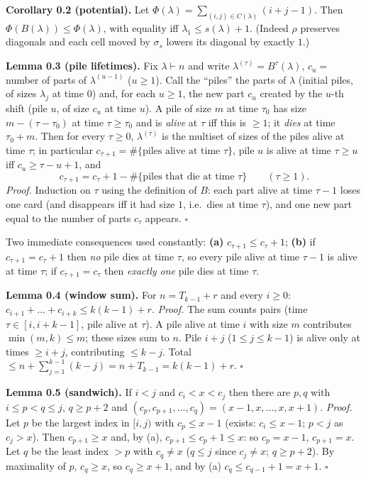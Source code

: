 \textbf{Corollary 0.2 (potential).} Let
\(\Phi(\lambda)=\sum_{(i,j)\in C(\lambda)}(i+j-1)\). Then
\(\Phi(B(\lambda))\le\Phi(\lambda)\), with equality iff
\(\lambda_1\le s(\lambda)+1\). (Indeed \(\rho\) preserves diagonals and
each cell moved by \(\sigma_s\) lowers its diagonal by exactly \(1\).)

\textbf{Lemma 0.3 (pile lifetimes).} Fix \(\lambda\vdash n\) and write
\(\lambda^{(\tau)}=B^{\tau}(\lambda)\), \(c_u=\) number of parts of
\(\lambda^{(u-1)}\) (\(u\ge1\)). Call the ``piles'' the parts of
\(\lambda\) (initial piles, of sizes \(\lambda_j\) at time \(0\)) and,
for each \(u\ge1\), the new part \(c_u\) created by the \(u\)-th shift
(pile \(u\), of size \(c_u\) at time \(u\)). A pile of size \(m\) at
time \(\tau_0\) has size \(m-(\tau-\tau_0)\) at time \(\tau\ge\tau_0\)
and is \emph{alive} at \(\tau\) iff this is \(\ge1\); it \emph{dies} at
time \(\tau_0+m\). Then for every \(\tau\ge0\), \(\lambda^{(\tau)}\) is
the multiset of sizes of the piles alive at time \(\tau\); in particular
\(c_{\tau+1}=\#\{\text{piles alive at time }\tau\}\), pile \(u\) is
alive at time \(\tau\ge u\) iff \(c_u\ge\tau-u+1\), and
\[c_{\tau+1}=c_\tau+1-\#\{\text{piles that die at time }\tau\}\qquad(\tau\ge1).\tag{0.3}\]
\emph{Proof.} Induction on \(\tau\) using the definition of \(B\): each
part alive at time \(\tau-1\) loses one card (and disappears iff it had
size \(1\), i.e.~dies at time \(\tau\)), and one new part equal to the
number of parts \(c_\tau\) appears. \(\square\)

Two immediate consequences used constantly: \textbf{(a)}
\(c_{\tau+1}\le c_\tau+1\); \textbf{(b)} if \(c_{\tau+1}=c_\tau+1\) then
\emph{no} pile dies at time \(\tau\), so every pile alive at time
\(\tau-1\) is alive at time \(\tau\); if \(c_{\tau+1}=c_\tau\) then
\emph{exactly one} pile dies at time \(\tau\).

\textbf{Lemma 0.4 (window sum).} For \(n=T_{k-1}+r\) and every
\(i\ge0\): \(c_{i+1}+\dots+c_{i+k}\le k(k-1)+r\). \emph{Proof.} The sum
counts pairs (time \(\tau\in[i,i+k-1]\), pile alive at \(\tau\)). A pile
alive at time \(i\) with size \(m\) contributes \(\min(m,k)\le m\);
these sizes sum to \(n\). Pile \(i+j\) (\(1\le j\le k-1\)) is alive only
at times \(\ge i+j\), contributing \(\le k-j\). Total
\(\le n+\sum_{j=1}^{k-1}(k-j)=n+T_{k-1}=k(k-1)+r\). \(\square\)

\textbf{Lemma 0.5 (sandwich).} If \(i<j\) and \(c_i<x<c_j\) then there
are \(p,q\) with \(i\le p<q\le j\), \(q\ge p+2\) and
\((c_p,c_{p+1},\dots,c_q)=(x-1,x,\dots,x,x+1)\). \emph{Proof.} Let \(p\)
be the largest index in \([i,j)\) with \(c_p\le x-1\) (exists:
\(c_i\le x-1\); \(p<j\) as \(c_j>x\)). Then \(c_{p+1}\ge x\) and, by
(a), \(c_{p+1}\le c_p+1\le x\): so \(c_p=x-1\), \(c_{p+1}=x\). Let \(q\)
be the least index \(>p\) with \(c_q\ne x\) (\(q\le j\) since
\(c_j\ne x\); \(q\ge p+2\)). By maximality of \(p\), \(c_q\ge x\), so
\(c_q\ge x+1\), and by (a) \(c_q\le c_{q-1}+1=x+1\). \(\square\)

